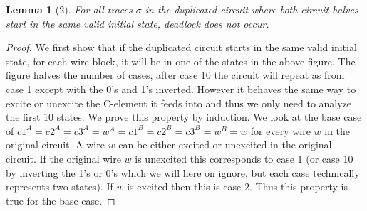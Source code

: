 \documentclass{article}
\newtheorem*{lemma}{Lemma}
\begin{document}
\begin{lemma}[2]
For all traces $\sigma$ in the duplicated circuit where both circuit halves start in the same valid initial state, deadlock does not occur.
\end{lemma}
\begin{proof}
We first show that if the duplicated circuit starts in the same valid initial state, for each wire block, it will be in one of the states in the above figure.  The figure halves the number of cases, after case 10 the circuit will repeat as from case 1 except with the 0's and 1's inverted.  However it behaves the same way to excite or unexcite the C-element it feeds into and thus we only need to analyze the first 10 states.  \newline
We prove this property by induction.  We look at the base case of $c1^A=c2^A=c3^A=w^A=c1^B=c2^B=c3^B=w^B=w$ for every wire $w$ in the original circuit.  A wire $w$ can be either excited or unexcited in the original circuit. If the original wire $w$ is unexcited this corresponds to case 1 (or case 10 by inverting the 1's or 0's which we will here on ignore, but each case technically represents two states).  If $w$ is excited then this is case 2.  Thus this property is true for the base case. \newline


\end{proof}
\end{document}
